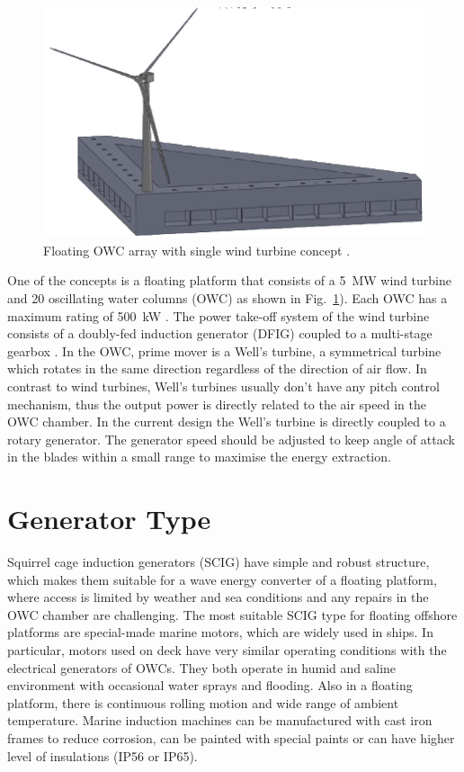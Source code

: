 \documentclass[twocolumn]{article}
\begin{document}
  \begin{figure}
    \centering
    \includegraphics[]{owc_array}
    \caption{Floating OWC array with single wind turbine concept \cite{Sullivan2013}.} 
    \label{owc_array}
  \end{figure}

One of the concepts is a floating platform that consists of a 5~MW wind turbine and 20 oscillating water columns (OWC) as shown in Fig.~\ref{owc_array}). Each OWC has a maximum rating of 500~kW \cite{Sullivan2013}.
The power take-off system of the wind turbine consists of a doubly-fed induction generator (DFIG) coupled to a multi-stage gearbox \cite{Jonkman2009}. In the OWC, prime mover is a Well's turbine, a symmetrical turbine which rotates in the same direction regardless of the direction of air flow. In contrast to wind turbines, Well's turbines usually don't have any pitch control mechanism, thus the output power is directly related to the air speed in the OWC chamber. In the current design the Well's turbine is directly coupled to a rotary generator. The generator speed should be adjusted to keep angle of attack in the blades within a small range to maximise the energy extraction.


\section{Generator Type}

Squirrel cage induction generators (SCIG) have simple and robust structure, which makes them suitable for a wave energy converter of a floating platform, where access is limited by weather and sea conditions and any repairs in the OWC chamber are challenging. 
The most suitable SCIG type for floating offshore platforms are special-made marine motors, which are widely used in ships. In particular, motors used on deck have very similar operating conditions with the electrical generators of OWCs. They both operate in humid and saline environment with occasional water sprays and flooding. Also in a floating platform, there is continuous rolling motion and wide range of ambient temperature. Marine induction machines can be manufactured  with cast iron frames to reduce corrosion, can be painted with special paints or can have higher level of insulations (IP56 or IP65).
\end{document}
